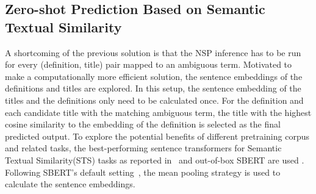 \subsection{Zero-shot Prediction Based on Semantic Textual Similarity}
\label{sec:sim}
A shortcoming of the previous solution is that the NSP inference has to be run for every (definition, title) pair mapped to an ambiguous term. Motivated to make a computationally more efficient solution, %
the sentence embeddings of the definitions and titles are explored. 
In this setup, %
the sentence embedding of the titles and the definitions only need to be calculated once. For the definition and each candidate title with the matching ambiguous term, %
the title with the highest cosine similarity to the embedding of the definition is selected as the final predicted output.  To explore the potential benefits of different pretraining corpus and related tasks, %
the best-performing sentence transformers for Semantic Textual Similarity(STS) tasks as reported in~\cite{steinfeldt2024evaluation} and out-of-box SBERT are used%
. Following SBERT's default setting~\cite{reimers2019sentence}, %
the mean pooling strategy is used to calculate the sentence embeddings. 